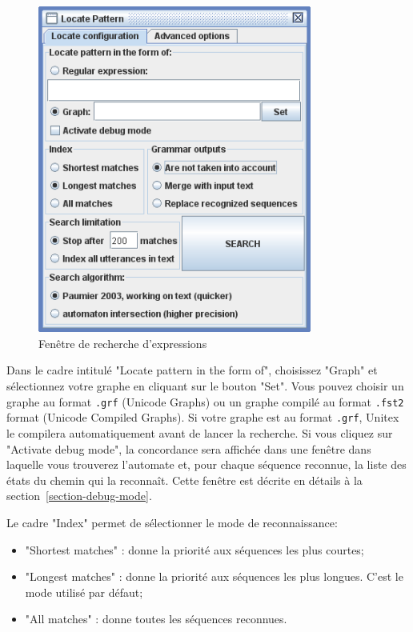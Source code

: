\begin{figure}[!h]
\begin{center}
\includegraphics[width=9cm]{resources/img/fig6-30.png}
\caption{Fenêtre de recherche d’expressions\label{fig-regexp-frame}}
\end{center}
\end{figure}

\noindent Dans le cadre intitulé "Locate pattern in the form of", choisissez "Graph" et sélectionnez
votre graphe en cliquant sur le bouton "Set". Vous pouvez choisir un graphe au format
 \verb+.grf+ (Unicode Graphs) ou un graphe compilé au format \verb+.fst2+ format (Unicode
Compiled Graphs). Si votre graphe est au format \verb+.grf+, Unitex le compilera
 automatiquement avant de lancer la recherche. Si vous cliquez sur "Activate debug mode", la
 concordance sera affichée dans une fenêtre dans laquelle vous trouverez l'automate et, 
 pour chaque séquence reconnue, la liste des états du chemin qui la reconnaît. Cette fenêtre est décrite en détails à la section~\ref{section-debug-mode}.

\bigskip
\noindent Le cadre "Index" permet de sélectionner le mode de reconnaissance:

\begin{itemize}
  \item "Shortest matches" : donne la priorité aux séquences les plus courtes;
  \item "Longest matches" :  donne la priorité aux séquences les plus longues. C’est le mode
utilisé par défaut;
  \item "All matches" : donne toutes les séquences reconnues.
\end{itemize}

